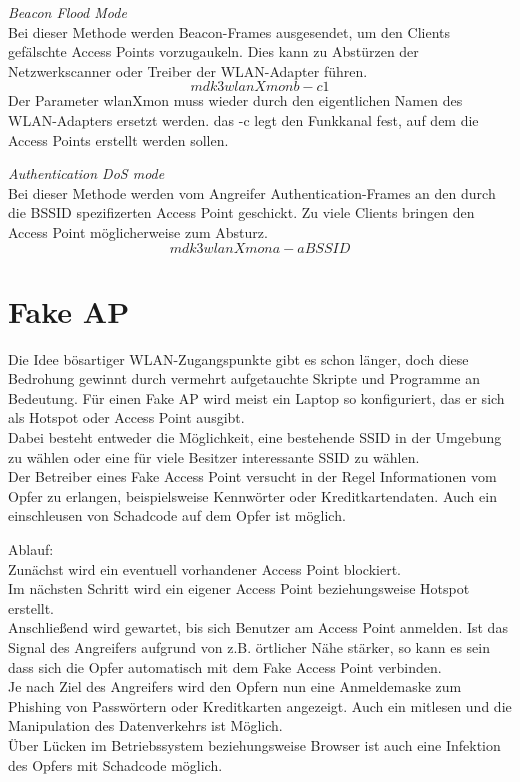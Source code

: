 \textit{Beacon Flood Mode}\\
Bei dieser Methode werden Beacon-Frames ausgesendet, um den Clients gefälschte Access Points vorzugaukeln. Dies kann zu Abstürzen der Netzwerkscanner oder Treiber der WLAN-Adapter führen. 
$$mdk3 wlanXmon b -c 1$$
Der Parameter wlanXmon muss wieder durch den eigentlichen Namen des WLAN-Adapters ersetzt werden.
das -c legt den Funkkanal fest, auf dem die Access Points erstellt werden sollen. 

\textit{Authentication DoS mode}\\
Bei dieser Methode werden vom Angreifer Authentication-Frames an den durch die BSSID spezifizerten Access Point geschickt. Zu viele Clients bringen den Access Point möglicherweise zum Absturz. 
$$mdk3 wlanXmon a -a BSSID$$


\section{Fake AP}
Die Idee bösartiger WLAN-Zugangspunkte gibt es schon länger, doch diese Bedrohung gewinnt durch vermehrt aufgetauchte Skripte und Programme an Bedeutung. Für einen Fake AP wird meist ein Laptop so konfiguriert, das er sich als Hotspot oder Access Point ausgibt.\\ Dabei besteht entweder die Möglichkeit, eine bestehende SSID in der Umgebung zu wählen oder eine für viele Besitzer interessante SSID zu wählen. \\

Der Betreiber eines Fake Access Point versucht in der Regel Informationen vom Opfer zu erlangen, beispielsweise Kennwörter oder Kreditkartendaten. Auch ein einschleusen von Schadcode auf dem Opfer ist möglich. 

Ablauf: \\

Zunächst wird ein eventuell vorhandener Access Point blockiert. \\ 
Im nächsten Schritt wird ein eigener Access Point beziehungsweise Hotspot erstellt. \\
Anschließend wird gewartet, bis sich Benutzer am Access Point anmelden. Ist das Signal des Angreifers aufgrund von z.B. örtlicher Nähe stärker, so kann es sein dass sich die Opfer automatisch mit dem Fake Access Point verbinden. \\
Je nach Ziel des Angreifers wird den Opfern nun eine Anmeldemaske zum Phishing von Passwörtern oder Kreditkarten angezeigt. 
Auch ein mitlesen und die Manipulation 	  des Datenverkehrs ist Möglich. \\ Über Lücken im Betriebssystem beziehungsweise Browser ist auch eine Infektion des Opfers mit Schadcode möglich. 

